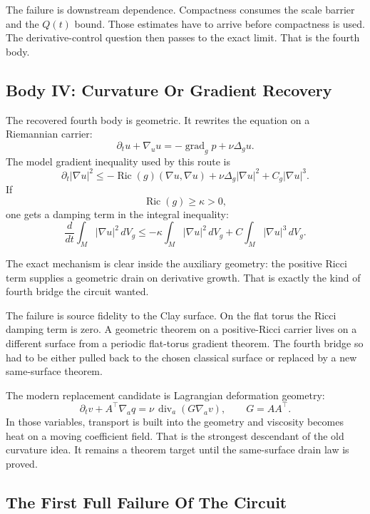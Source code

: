 The failure is downstream dependence.
Compactness consumes the scale barrier and the \(Q(t)\) bound.
Those estimates have to arrive before compactness is used.
The derivative-control question then passes to the exact limit.
That is the fourth body.

\subsection{Body IV: Curvature Or Gradient Recovery}

The recovered fourth body is geometric.
It rewrites the equation on a Riemannian carrier:
\[
  \partial_t u+\nabla_u u
  =
  -\operatorname{grad}_g p+\nu\Delta_g u .
\]
The model gradient inequality used by this route is
\[
  \partial_t|\nabla u|^2
  \le
  -\operatorname{Ric}(g)(\nabla u,\nabla u)
  +\nu\Delta_g|\nabla u|^2
  +C_g|\nabla u|^3 .
\]
If
\[
  \operatorname{Ric}(g)\ge\kappa>0,
\]
one gets a damping term in the integral inequality:
\[
  \frac{d}{dt}\int_M|\nabla u|^2\,dV_g
  \le
  -\kappa\int_M|\nabla u|^2\,dV_g
  +C\int_M|\nabla u|^3\,dV_g .
\]

The exact mechanism is clear inside the auxiliary geometry: the positive Ricci
term supplies a geometric drain on derivative growth.
That is exactly the kind of fourth bridge the circuit wanted.

The failure is source fidelity to the Clay surface.
On the flat torus the Ricci damping term is zero.
A geometric theorem on a positive-Ricci carrier lives on a different surface
from a periodic flat-torus gradient theorem.
The fourth bridge so had to be either pulled back to the chosen
classical surface or replaced by a new same-surface theorem.

The modern replacement candidate is Lagrangian deformation geometry:
\[
  \partial_t v + A^\top\nabla_a q
  =
  \nu\,\operatorname{div}_a(G\nabla_a v),
  \qquad
  G=AA^\top .
\]
In those variables, transport is built into the geometry and viscosity
becomes heat on a moving coefficient field.
That is the strongest descendant of the old curvature idea.
It remains a theorem target until the same-surface drain law is proved.

\subsection{The First Full Failure Of The Circuit}

